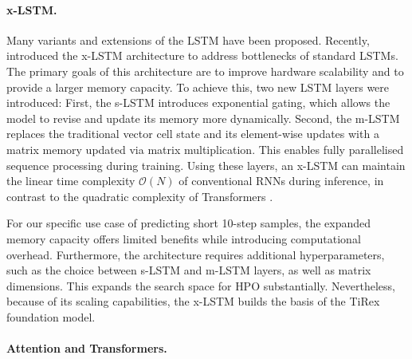 \paragraph{x-LSTM.} 
Many variants and extensions of the \ac{LSTM} have been proposed.
Recently, \textcite{beck2024xlstmextendedlongshortterm} introduced the \ac{x-LSTM} architecture to address bottlenecks of standard \acp{LSTM}. The primary goals of this architecture are to improve hardware scalability and to provide a larger memory capacity. To achieve this, two new \ac{LSTM} layers were introduced: First, the \ac{s-LSTM} introduces exponential gating, which allows the model to revise and update its memory more dynamically. Second, the \ac{m-LSTM} replaces the traditional vector cell state and its element-wise updates with a matrix memory updated via matrix multiplication. This %
enables fully parallelised sequence processing during training.
Using these layers, an \ac{x-LSTM} can maintain the linear time complexity $\mathcal{O}(N)$ of conventional \acp{RNN} during inference, in contrast to the quadratic complexity of Transformers \parencite{beck2024xlstmextendedlongshortterm, attentioniayn}. %

For our specific use case of predicting short 10-step samples, the expanded memory capacity offers limited benefits while introducing computational overhead. Furthermore, the architecture requires additional hyperparameters, such as the choice between \ac{s-LSTM} and \ac{m-LSTM} layers, as well as matrix dimensions. %
This expands the search space for \ac{HPO} substantially. %
Nevertheless, because of its scaling capabilities, the \ac{x-LSTM} builds the basis of the TiRex foundation model. %


\paragraph{Attention and Transformers.}

